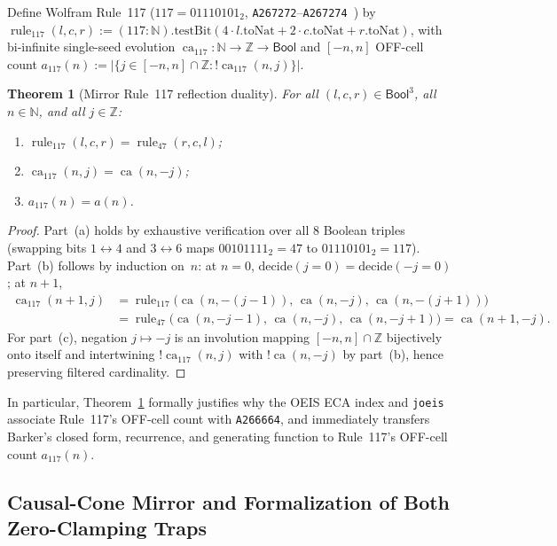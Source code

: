 \documentclass[11pt]{article}
\newtheorem{theorem}{Theorem}[section]
\theoremstyle{definition}
\newcommand{\N}{\mathbb{N}}
\newcommand{\Z}{\mathbb{Z}}
\newcommand{\seq}[1]{\texttt{#1}}
\newcommand{\ruleFS}{\operatorname{rule}_{47}}
\newcommand{\ruleOS}{\operatorname{rule}_{117}}
\newcommand{\ca}{\operatorname{ca}}
\begin{document}
Define Wolfram Rule~117 ($117 = 01110101_2$, \seq{A267272}--\seq{A267274}~\cite{oeis267272,oeis267274}) by $\ruleOS(l, c, r) := (117 : \N).\mathrm{testBit}(4 \cdot l.\mathrm{toNat} + 2 \cdot c.\mathrm{toNat} + r.\mathrm{toNat})$, with bi-infinite single-seed evolution $\ca_{117} : \N \to \Z \to \mathsf{Bool}$ and $[-n, n]$ OFF-cell count $a_{117}(n) := |\{j \in [-n, n] \cap \Z : !\ca_{117}(n, j)\}|$.

\begin{theorem}[Mirror Rule~117 reflection duality]
\label{thm:mirror117}
For all $(l, c, r) \in \mathsf{Bool}^3$, all $n \in \N$, and all $j \in \Z$:
\begin{enumerate}
\item[\textup{(a)}] $\ruleOS(l, c, r) = \ruleFS(r, c, l)$;
\item[\textup{(b)}] $\ca_{117}(n, j) = \ca(n, -j)$;
\item[\textup{(c)}] $a_{117}(n) = a(n)$.
\end{enumerate}
\end{theorem}

\begin{proof}
Part~(a) holds by exhaustive verification over all $8$ Boolean triples (swapping bits $1 \leftrightarrow 4$ and $3 \leftrightarrow 6$ maps $00101111_2 = 47$ to $01110101_2 = 117$). Part~(b) follows by induction on~$n$: at $n = 0$, $\mathrm{decide}(j = 0) = \mathrm{decide}(-j = 0)$; at $n + 1$,
\begin{align*}
\ca_{117}(n + 1, j)
  &= \ruleOS\bigl(\ca(n, -(j - 1)),\, \ca(n, -j),\, \ca(n, -(j + 1))\bigr) \\
  &= \ruleFS\bigl(\ca(n, -j - 1),\, \ca(n, -j),\, \ca(n, -j + 1)\bigr)
  = \ca(n + 1, -j).
\end{align*}
For part~(c), negation $j \mapsto -j$ is an involution mapping $[-n, n] \cap \Z$ bijectively onto itself and intertwining $!\ca_{117}(n, j)$ with $!\ca(n, -j)$ by part~(b), hence preserving filtered cardinality.
\end{proof}

\noindent In particular, Theorem~\ref{thm:mirror117} formally justifies why the OEIS ECA index and \texttt{joeis} associate Rule~117's OFF-cell count with \seq{A266664}, and immediately transfers Barker's closed form, recurrence, and generating function to Rule~117's OFF-cell count $a_{117}(n)$.

\subsection{Causal-Cone Mirror and Formalization of Both Zero-Clamping Traps}
\end{document}
